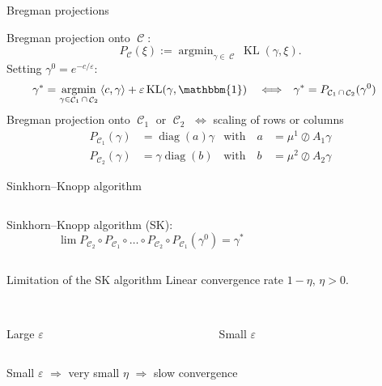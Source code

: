\documentclass[compress]{beamer}
\newcommand{\scal}[2]{\left\langle #1 , #2 \right\rangle}
\DeclareMathOperator*{\argmin}{argmin}
\DeclareMathOperator{\One}{\mathbbm{1}}
\DeclareMathOperator{\Ccal}{\mathcal{C}}
\DeclareMathOperator{\diag}{diag}
\DeclareMathOperator{\KL}{KL}
\renewcommand{\epsilon}{\varepsilon}
\begin{document}
\begin{frame}{Bregman projections}
	
Bregman projection onto $\Ccal$:
\[
P_{\Ccal}(\xi) := \argmin_{\gamma \in \Ccal} \KL(\gamma,\xi).
\]
\pause
Setting $\gamma^0 = e^{-c/\epsilon}$:
\begin{align*}
\gamma^* &= \argmin_{\gamma \in \Ccal_1 \cap \Ccal_2}
	\scal{c}{\gamma} + \epsilon \KL(\gamma,\One)
& &\Longleftrightarrow &
\gamma^* &= P_{\Ccal_1 \cap \Ccal_2}(\gamma^0)
\end{align*}
\pause
Bregman projection onto $\Ccal_1$ or $\Ccal_2$ $\Longleftrightarrow$ scaling of rows or columns
\begin{align*}\label{scaling}
P_{\Ccal_1}(\gamma) &= \diag(a) \gamma &\text{with}\quad
a &=  {\mu^1}\oslash{A_1 \gamma} \\
P_{\Ccal_2}(\gamma) &= \gamma \diag(b) &\text{with}\quad
b &= {\mu^2}\oslash{A_2 \gamma}\nonumber
\end{align*}

\end{frame}

\begin{frame}{Sinkhorn--Knopp algorithm}
	
	\begin{columns}
	\begin{column}{0.6\textwidth}

	Sinkhorn--Knopp algorithm (SK):
	\[
	\lim P_{\Ccal_2}\circ P_{\Ccal_1} \circ \ldots \circ P_{\Ccal_2} \circ P_{\Ccal_1} (\gamma^0) = \gamma^*
	\]
	
\end{column}

\begin{column}{0.4\textwidth}
	\centering
	
\end{column}
\end{columns}
\end{frame}

\begin{frame}{Limitation of the SK algorithm}
Linear convergence rate $1-\eta$, $\eta > 0$.

\begin{columns}
	\begin{column}{0.5\textwidth}
		\centering
		\\
		Large $\epsilon$
	\end{column}
	\begin{column}{0.5\textwidth}
		\centering
		\\
		Small $\epsilon$
	\end{column}
\end{columns}

Small $\epsilon$ $\Longrightarrow$
very small $\eta$ $\Longrightarrow$
slow convergence
\end{frame}
\end{document}
